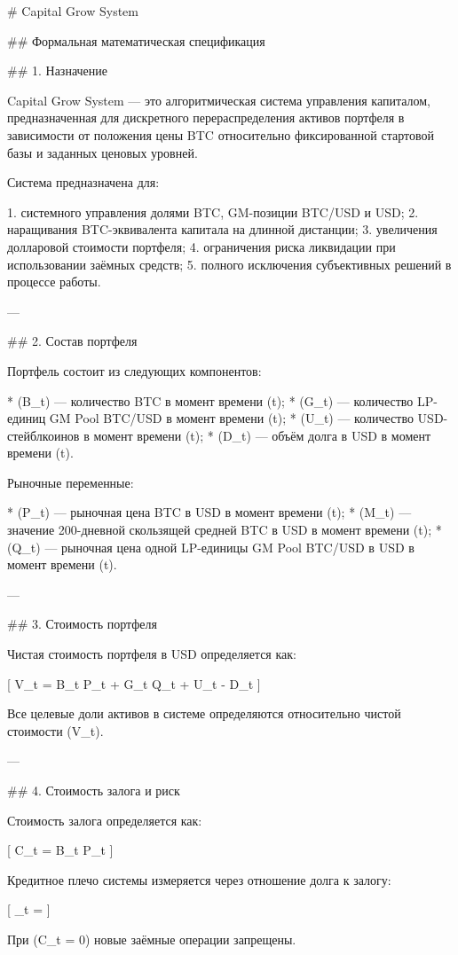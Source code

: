 # Capital Grow System

## Формальная математическая спецификация

## 1. Назначение

Capital Grow System — это алгоритмическая система управления капиталом, предназначенная для дискретного перераспределения активов портфеля в зависимости от положения цены BTC относительно фиксированной стартовой базы и заданных ценовых уровней.

Система предназначена для:

1. системного управления долями BTC, GM-позиции BTC/USD и USD;
2. наращивания BTC-эквивалента капитала на длинной дистанции;
3. увеличения долларовой стоимости портфеля;
4. ограничения риска ликвидации при использовании заёмных средств;
5. полного исключения субъективных решений в процессе работы.

---

## 2. Состав портфеля

Портфель состоит из следующих компонентов:

* (B_t) — количество BTC в момент времени (t);
* (G_t) — количество LP-единиц GM Pool BTC/USD в момент времени (t);
* (U_t) — количество USD-стейблкоинов в момент времени (t);
* (D_t) — объём долга в USD в момент времени (t).

Рыночные переменные:

* (P_t) — рыночная цена BTC в USD в момент времени (t);
* (M_t) — значение 200-дневной скользящей средней BTC в USD в момент времени (t);
* (Q_t) — рыночная цена одной LP-единицы GM Pool BTC/USD в USD в момент времени (t).

---

## 3. Стоимость портфеля

Чистая стоимость портфеля в USD определяется как:

[
V_t = B_t P_t + G_t Q_t + U_t - D_t
]

Все целевые доли активов в системе определяются относительно чистой стоимости (V_t).

---

## 4. Стоимость залога и риск

Стоимость залога определяется как:

[
C_t = B_t P_t
]

Кредитное плечо системы измеряется через отношение долга к залогу:

[
_t = 
]

При (C_t = 0) новые заёмные операции запрещены.

